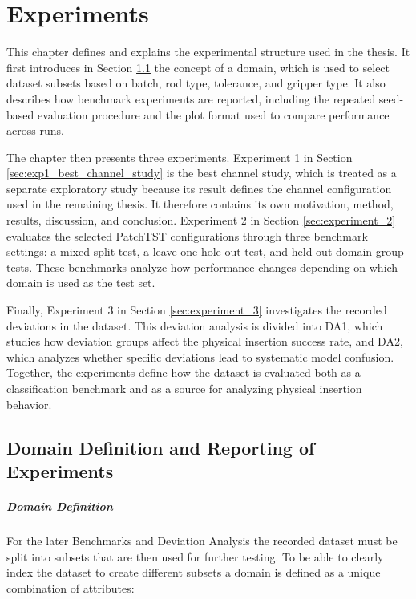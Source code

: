 \chapter{Experiments} \label{ch:experiments}
This chapter defines and explains the experimental structure used in the thesis. It first introduces in Section \ref{sec:reporing_of_experiments} the concept of a domain, which is used to select dataset subsets based on batch, rod type, tolerance, and gripper type. It also describes how benchmark experiments are reported, including the repeated seed-based evaluation procedure and the plot format used to compare performance across runs.

The chapter then presents three experiments. Experiment 1 in Section \ref{sec:exp1_best_channel_study} is the best channel study, which is treated as a separate exploratory study because its result defines the channel configuration used in the remaining thesis. It therefore contains its own motivation, method, results, discussion, and conclusion. Experiment 2 in Section \ref{sec:experiment_2} evaluates the selected PatchTST configurations through three benchmark settings: a mixed-split test, a leave-one-hole-out test, and held-out domain group tests. These benchmarks analyze how performance changes depending on which domain is used as the test set.

Finally, Experiment 3 in Section \ref{sec:experiment_3} investigates the recorded deviations in the dataset. This deviation analysis is divided into DA1, which studies how deviation groups affect the physical insertion success rate, and DA2, which analyzes whether specific deviations lead to systematic model confusion. Together, the experiments define how the dataset is evaluated both as a classification benchmark and as a source for analyzing physical insertion behavior.

\section{Domain Definition and Reporting of Experiments} \label{sec:reporing_of_experiments}
\paragraph{Domain Definition}
For the later Benchmarks and Deviation Analysis the recorded dataset must be split into subsets that are then used for further testing. To be able to clearly index the dataset to create different subsets a domain is defined as a unique combination of attributes:


